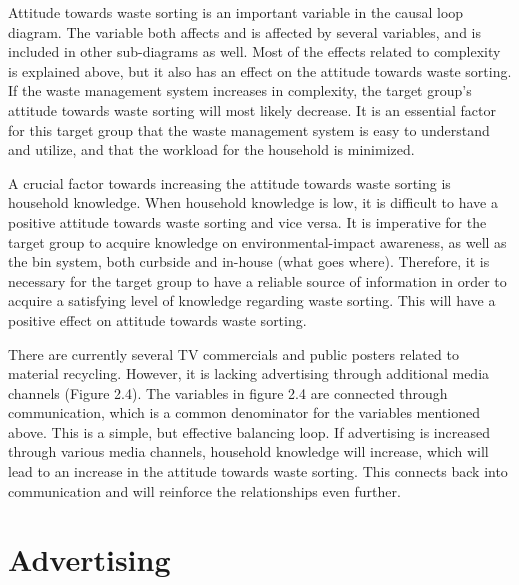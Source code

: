 \indent \newline
Attitude towards waste sorting is an important variable in the causal loop diagram. The variable both affects and is affected by several variables, and is included in other sub-diagrams as well. Most of the effects related to complexity is explained above, but it also has an effect on the attitude towards waste sorting. If the waste management system increases in complexity, the target group's attitude towards waste sorting will most likely decrease. It is an essential factor for this target group that the waste management system is easy to understand and utilize, and that the workload for the household is minimized. 

\indent \newline
A crucial factor towards increasing the attitude towards waste sorting is household knowledge. When household knowledge is low, it is difficult to have a positive attitude towards waste sorting and vice versa. It is imperative for the target group to acquire knowledge on environmental-impact awareness, as well as the bin system, both curbside and in-house (what goes where). Therefore, it is necessary for the target group to have a reliable source of information in order to acquire a satisfying level of knowledge regarding waste sorting. This will have a positive effect on attitude towards waste sorting.

\indent \newline
There are currently several TV commercials and public posters related to material recycling. However, it is lacking advertising through additional media channels (Figure 2.4). The variables in figure 2.4 are connected through communication, which is a common denominator for the variables mentioned above. This is a simple, but effective balancing loop. If advertising is increased through various media channels, household knowledge will increase, which will lead to an increase in the attitude towards waste sorting. This connects back into communication and will reinforce the relationships even further.

\section{Advertising}

